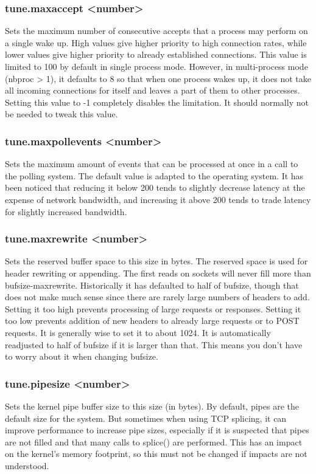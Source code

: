 \subsubsection[tune.maxaccept]{tune.maxaccept <number>}
  Sets the maximum number of consecutive accepts that a process may perform on
  a single wake up. High values give higher priority to high connection rates,
  while lower values give higher priority to already established connections.
  This value is limited to 100 by default in single process mode. However, in
  multi-process mode (nbproc > 1), it defaults to 8 so that when one process
  wakes up, it does not take all incoming connections for itself and leaves a
  part of them to other processes. Setting this value to -1 completely disables
  the limitation. It should normally not be needed to tweak this value.

\subsubsection[tune.maxpollevents]{tune.maxpollevents <number>}
  Sets the maximum amount of events that can be processed at once in a call to
  the polling system. The default value is adapted to the operating system. It
  has been noticed that reducing it below 200 tends to slightly decrease
  latency at the expense of network bandwidth, and increasing it above 200
  tends to trade latency for slightly increased bandwidth.

\subsubsection[tune.maxrewrite]{tune.maxrewrite <number>}
  Sets the reserved buffer space to this size in bytes. The reserved space is
  used for header rewriting or appending. The first reads on sockets will never
  fill more than bufsize-maxrewrite. Historically it has defaulted to half of
  bufsize, though that does not make much sense since there are rarely large
  numbers of headers to add. Setting it too high prevents processing of large
  requests or responses. Setting it too low prevents addition of new headers
  to already large requests or to POST requests. It is generally wise to set it
  to about 1024. It is automatically readjusted to half of bufsize if it is
  larger than that. This means you don't have to worry about it when changing
  bufsize.

\subsubsection[tune.pipesize]{tune.pipesize <number>}
  Sets the kernel pipe buffer size to this size (in bytes). By default, pipes
  are the default size for the system. But sometimes when using TCP splicing,
  it can improve performance to increase pipe sizes, especially if it is
  suspected that pipes are not filled and that many calls to splice() are
  performed. This has an impact on the kernel's memory footprint, so this must
  not be changed if impacts are not understood.

